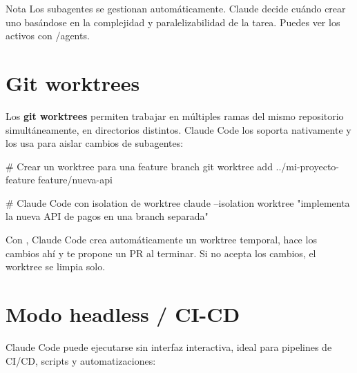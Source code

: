 \documentclass[11pt,a4paper]{report}
\DeclareRobustCommand{\texttt}[1]{{\ttfamily\seqsplit{#1}}}
\begin{document}
\begin{calloutbox}{Nota}
Los subagentes se gestionan automáticamente. Claude decide cuándo crear uno basándose en la complejidad y paralelizabilidad de la tarea. Puedes ver los activos con /agents.\end{calloutbox}

\section{Git worktrees}

Los \textbf{git worktrees} permiten trabajar en múltiples ramas del mismo repositorio simultáneamente, en directorios distintos. Claude Code los soporta nativamente y los usa para aislar cambios de subagentes:

\begin{codebox}
# Crear un worktree para una feature branch
git worktree add ../mi-proyecto-feature feature/nueva-api

# Claude Code con isolation de worktree
claude --isolation worktree "implementa la nueva API de pagos en una branch separada"
\end{codebox}

Con \texttt{--isolation worktree}, Claude Code crea automáticamente un worktree temporal, hace los cambios ahí y te propone un PR al terminar. Si no acepta los cambios, el worktree se limpia solo.

\section{Modo headless / CI-CD}

Claude Code puede ejecutarse sin interfaz interactiva, ideal para pipelines de CI/CD, scripts y automatizaciones:

\end{document}
